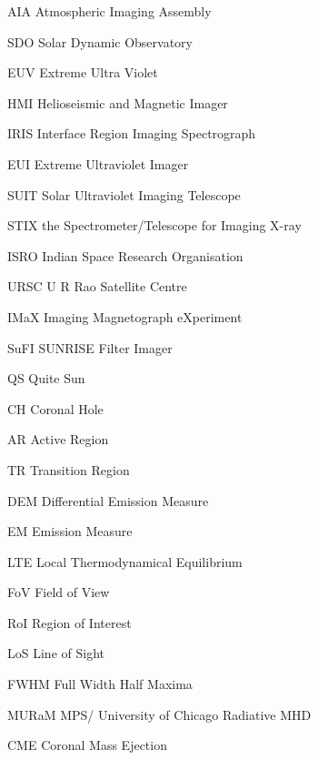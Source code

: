 \begin{abbrv}

\item[AIA]  Atmospheric Imaging Assembly
\item[SDO]  Solar Dynamic Observatory
\item[EUV]  Extreme Ultra Violet
\item[HMI]  Helioseismic and Magnetic Imager 
\item[IRIS] Interface Region Imaging Spectrograph 
\item[EUI]  Extreme Ultraviolet Imager
\item[SUIT] Solar Ultraviolet Imaging Telescope
\item[STIX] the Spectrometer/Telescope for Imaging X-ray 
\item[ISRO] Indian Space Research Organisation 
\item[URSC] U R Rao Satellite Centre 
\item[IMaX] Imaging Magnetograph eXperiment
\item[SuFI] SUNRISE Filter Imager
\item[QS]   Quite Sun
\item[CH]   Coronal Hole
\item[AR]   Active Region
\item[TR]   Transition Region
\item[DEM]  Differential Emission Measure
\item[EM]   Emission Measure
\item[LTE]  Local Thermodynamical Equilibrium 
\item[FoV]  Field of View
\item[RoI]  Region of Interest 
\item[LoS]  Line of Sight
\item[FWHM] Full Width Half Maxima
\item[MURaM] MPS/ University of Chicago Radiative MHD 
\item[CME] Coronal Mass Ejection

\end{abbrv}